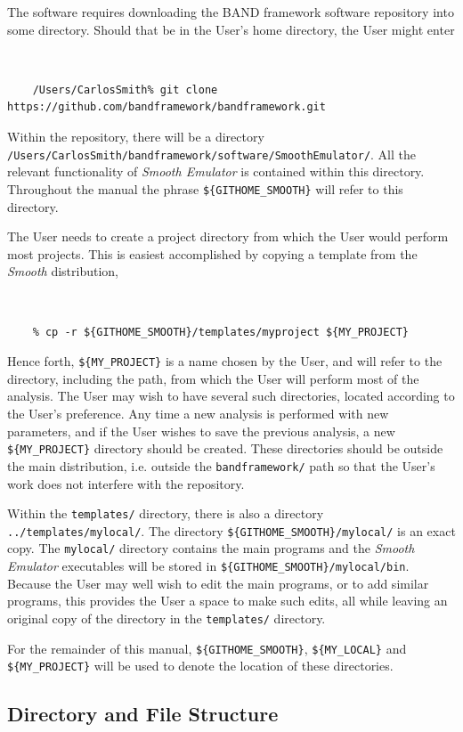\documentclass[UserManual.tex]{subfiles}
\begin{document}
The software requires downloading the BAND framework software repository into some directory. Should that be in the User's home directory, the User might enter
{\tt 
\begin{verbatim}
    /Users/CarlosSmith% git clone https://github.com/bandframework/bandframework.git
\end{verbatim}
}
Within the repository, there will be a directory {\tt /Users/CarlosSmith/bandframework/software/SmoothEmulator/}. All the relevant functionality of {\it Smooth Emulator} is contained within this directory. Throughout the manual the phrase {\tt \$\{GITHOME\_SMOOTH\}} will refer to this directory. 

The User needs to create a project directory from which the User would perform most projects. This is easiest accomplished by copying a template from the {\it Smooth} distribution,
{\tt
\begin{verbatim}
    % cp -r ${GITHOME_SMOOTH}/templates/myproject ${MY_PROJECT}
\end{verbatim}
}
Hence forth, {\tt \$\{MY\_PROJECT\}} is a name chosen by the User, and will refer to the directory, including the path, from which the User will perform most of the analysis. The User may wish to have several such directories, located according to the User's preference. Any time a new analysis is performed with new parameters, and if the User wishes to save the previous analysis, a new {\tt \$\{MY\_PROJECT\}} directory should be created. These directories should be outside the main distribution, i.e. outside the {\tt bandframework/} path so that the User's work does not interfere with the repository. 

Within the {\tt templates/} directory, there is also a directory {\tt ../templates/mylocal/}. The directory {\tt \$\{GITHOME\_SMOOTH\}/mylocal/} is an exact copy. The {\tt mylocal/} directory contains the main programs and the {\it Smooth Emulator} executables will be stored in {\tt \$\{GITHOME\_SMOOTH\}/mylocal/bin}. Because the User may well wish to edit the main programs, or to add similar programs, this provides the User a space to make such edits, all while leaving an original copy of the directory in the {\tt templates/} directory. 

For the remainder of this manual, {\tt \$\{GITHOME\_SMOOTH\}}, {\tt \$\{MY\_LOCAL\}} and {\tt \$\{MY\_PROJECT\}} will be used to denote the location of these directories.

\subsection{Directory and File Structure}
\end{document}
